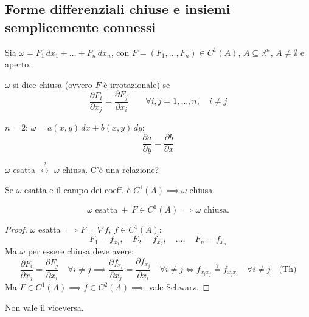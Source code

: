 \subsection{Forme differenziali chiuse e insiemi semplicemente connessi}

\begin{definition}
Sia $\omega = F_1\, dx_1 + \dots + F_n\, dx_n$, con $F = (F_1, \dots, F_n) \in C^1(A)$, $A \subseteq \mathbb{R}^n$, $A \neq \emptyset$ e aperto.

$\omega$ si dice \underline{chiusa} (ovvero $F$ è \underline{irrotazionale}) se
\[
\frac{\partial F_i}{\partial x_j} = \frac{\partial F_j}{\partial x_i} \qquad \forall i, j = 1, \dots, n, \quad i \neq j
\]
\end{definition}

\begin{esercizio}[EXE]
$n = 2$: $\omega = a(x, y)\, dx + b(x, y)\, dy$:
\[
\frac{\partial a}{\partial y} = \frac{\partial b}{\partial x}
\]
\end{esercizio}

\begin{oss}
$\omega$ esatta $\overset{?}{\longleftrightarrow}$ $\omega$ chiusa. C'è una relazione?

Se $\omega$ esatta e il campo dei coeff. è $C^1(A) \implies \omega$ chiusa.
\end{oss}

\begin{prop}
\[
\omega \text{ esatta} \ + \ F \in C^1(A) \implies \omega \text{ chiusa.}
\]
\end{prop}

\begin{proof}
$\omega$ esatta $\implies F = \nabla f$, $f \in C^1(A)$:
\[
F_1 = f_{x_1}, \quad F_2 = f_{x_2}, \quad \dots, \quad F_n = f_{x_n}
\]
Ma $\omega$ per essere chiusa deve avere:
\[
\frac{\partial F_i}{\partial x_j} = \frac{\partial F_j}{\partial x_i} \quad \forall i \neq j \implies \frac{\partial f_{x_i}}{\partial x_j} = \frac{\partial f_{x_j}}{\partial x_i} \quad \forall i \neq j \iff f_{x_i x_j} \overset{?}{=} f_{x_j x_i} \quad \forall i \neq j \quad \text{(Th)}
\]
Ma $F \in C^1(A) \implies f \in C^2(A) \implies$ vale Schwarz.
\end{proof}

\begin{oss}
\underline{Non vale il viceversa}.
\end{oss}

